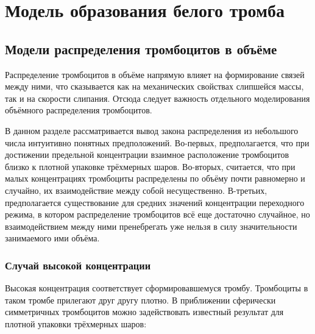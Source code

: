 \chapter{Модель образования белого тромба}
\label{chapter:blood} 

\section{Модели распределения тромбоцитов в объёме}
\label{section:volume_distribution_models}



Распределение тромбоцитов в объёме напрямую влияет на формирование связей между ними,
что сказывается как на механических свойствах слипшейся массы, так и на скорости слипания.
Отсюда следует важность отдельного моделирования объёмного распределения тромбоцитов.

В данном разделе рассматривается вывод закона распределения из небольшого числа интуитивно понятных предположений.
Во-первых, предполагается, что при достижении предельной концентрации взаимное расположение тромбоцитов
близко к плотной упаковке трёхмерных шаров.
Во-вторых, считается, что при малых концентрациях тромбоциты распределены по объёму почти равномерно и случайно,
их взаимодействие между собой несущественно.
В-третьих, предполагается существование для средних значений концентрации переходного режима,
в котором распределение тромбоцитов всё еще достаточно случайное,
но взаимодействием между ними пренебрегать уже нельзя в силу значительности занимаемого ими объёма.


\subsection{Случай высокой концентрации}
\label{subsection:volume_distribution_models:high_concentration}

Высокая концентрация соответствует сформировавшемуся тромбу.
Тромбоциты в таком тромбе прилегают друг другу плотно.
В приближении сферически симметричных тромбоцитов
можно задействовать известный результат для плотной упаковки трёхмерных шаров:

